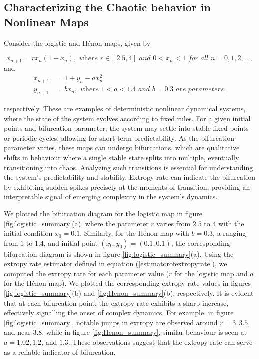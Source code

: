 \documentclass[pdflatex]{sn-jnl}%
\theoremstyle{thmstyleone}
\theoremstyle{thmstyletwo}%
\theoremstyle{thmstylethree}%
\begin{document}
\subsection{Characterizing the Chaotic behavior in Nonlinear Maps}

Consider the logistic and Hénon maps\cite{elaydi2007discrete}, given by 

\begin{equation}
x_{n+1}=rx_n(1-x_n), \textit{ \ \ where \ $r\in [2.5,4]$ \ and $0<x_n<1$ \ for all $n=0,1,2,...,$}
\end{equation}
and 
\begin{equation}
\begin{split}
    x_{n+1}&=1+y_n-ax_n^2 \\
    y_{n+1}&=bx_n, \textit{ \ where $1<a<1.4$ and $b=0.3$ are parameters,}
\end{split}
\end{equation}



respectively. These are examples of deterministic nonlinear dynamical systems, where the state of the system evolves according to fixed rules. For a given initial points and bifurcation parameter, the system may settle into stable fixed points or periodic cycles, allowing for short-term predictability. As the bifurcation parameter varies, these maps can undergo bifurcations, which are qualitative shifts in behaviour where a single stable state splits into multiple, eventually transitioning into chaos. Analyzing such transitions is essential for understanding the system's predictability and stability. Extropy rate can indicate the bifurcation by exhibiting sudden spikes precisely at the moments of transition, providing an interpretable signal of emerging complexity in the system's dynamics.


We plotted the bifurcation diagram for the logistic map in figure \ref{fig:logistic_summary}(a), where the parameter $r$ varies from $2.5$ to $4$ with the initial condition $x_0 = 0.1$. Similarly, for the Hénon map with $b = 0.3$, a ranging from $1$ to $1.4$, and initial point $(x_0, y_0) = (0.1, 0.1)$, the corresponding bifurcation diagram is shown in figure \ref{fig:logistic_summary}(a). Using the extropy rate estimator defined in equation (\ref{estimatorofextropyrate}), we computed the extropy rate for each parameter value ($r$ for the logistic map and $a$ for the Hénon map). We plotted the corresponding extropy rate values in figures \ref{fig:logistic_summary}(b) and \ref{fig:Henon_summary}(b), respectively. It is evident that at each bifurcation point, the extropy rate exhibits a sharp increase, effectively signalling the onset of complex dynamics. For example, in figure \ref{fig:logistic_summary}, notable jumps in extropy are observed around $r = 3, 3.5$, and near $3.8$, while in figure \ref{fig:Henon_summary}, similar behaviour is seen at $a = 1.02, 1.2$, and $1.3$. These observations suggest that the extropy rate can serve as a reliable indicator of bifurcation.
\end{document}
